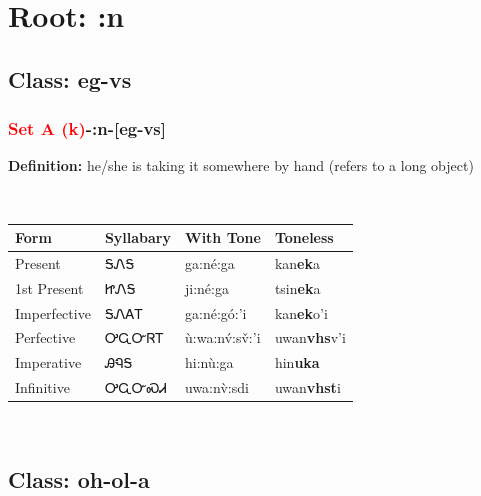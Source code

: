 \needspace{4in}
\section*{Root: :n}
\nopagebreak
{}
\needspace{3in}
\subsection*{Class: eg-vs}
\nopagebreak
\needspace{2in}
\subsubsection*{\textcolor{Red}{Set A (k)}{-}\textbf{:n}{-}[eg-vs]}
\nopagebreak
\textbf{Definition: } he/she is taking it somewhere by hand (refers to a long object)
\\[0.5em]
\begin{tabularx}{\textwidth}{l X X X}%
\toprule%
\textbf{Form}&\textbf{Syllabary}&\textbf{With Tone}&\textbf{Toneless}\\%
\midrule%
Present&ᎦᏁᎦ&ga:né:ga&kan\textbf{ek}a\\%
1st Present&ᏥᏁᎦ&ji:né:ga&tsin\textbf{ek}a\\%
Imperfective&ᎦᏁᎪᎢ&ga:né:gó:’i&kan\textbf{ek}o'i\\%
Perfective&ᎤᏩᏅᏒᎢ&ù:wa:nv́:sv̌:’i&uwan\textbf{vhs}v'i\\%
Imperative&ᎯᏄᎦ&hi:nù:ga&hin\textbf{uka}\\%
Infinitive&ᎤᏩᏅᏍᏗ&uwa:nv̀:sdi&uwan\textbf{vhst}i\\%
\bottomrule%
\end{tabularx}
\\[1em]
\needspace{3in}
\subsection*{Class: oh-ol-a}
\nopagebreak
\needspace{2in}
